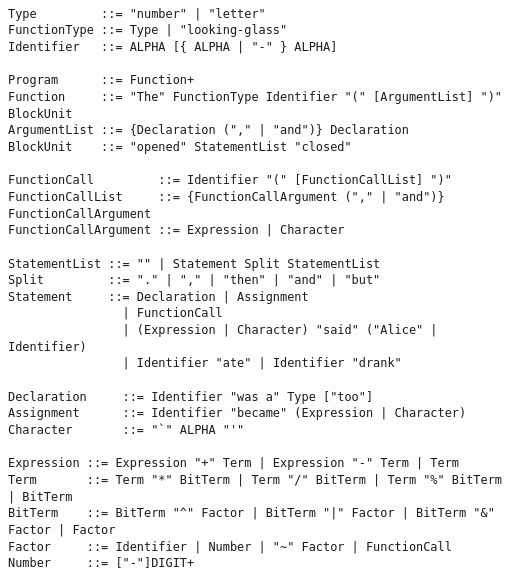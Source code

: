 \documentclass[a4wide, 11pt]{article}
\begin{document}
\begin{verbatim}

Type         ::= "number" | "letter"
FunctionType ::= Type | "looking-glass"
Identifier   ::= ALPHA [{ ALPHA | "-" } ALPHA]

Program      ::= Function+
Function     ::= "The" FunctionType Identifier "(" [ArgumentList] ")" BlockUnit
ArgumentList ::= {Declaration ("," | "and")} Declaration
BlockUnit    ::= "opened" StatementList "closed"

FunctionCall         ::= Identifier "(" [FunctionCallList] ")"
FunctionCallList     ::= {FunctionCallArgument ("," | "and")} FunctionCallArgument
FunctionCallArgument ::= Expression | Character

StatementList ::= "" | Statement Split StatementList
Split         ::= "." | "," | "then" | "and" | "but"
Statement     ::= Declaration | Assignment
                | FunctionCall
                | (Expression | Character) "said" ("Alice" | Identifier)
                | Identifier "ate" | Identifier "drank"
               
Declaration     ::= Identifier "was a" Type ["too"]
Assignment      ::= Identifier "became" (Expression | Character)
Character       ::= "`" ALPHA "'"

Expression ::= Expression "+" Term | Expression "-" Term | Term
Term       ::= Term "*" BitTerm | Term "/" BitTerm | Term "%" BitTerm | BitTerm
BitTerm    ::= BitTerm "^" Factor | BitTerm "|" Factor | BitTerm "&" Factor | Factor
Factor     ::= Identifier | Number | "~" Factor | FunctionCall
Number     ::= ["-"]DIGIT+ 

\end{verbatim}
\end{document}
